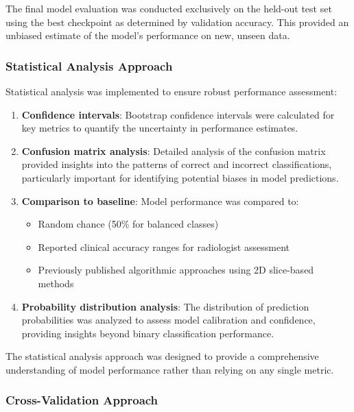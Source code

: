 \documentclass[12pt, a4paper]{article}
\begin{document}
The final model evaluation was conducted exclusively on the held-out test set using the best checkpoint as determined by validation accuracy. This provided an unbiased estimate of the model's performance on new, unseen data.

\subsubsection{Statistical Analysis Approach}

Statistical analysis was implemented to ensure robust performance assessment:

\begin{enumerate}
    \item \textbf{Confidence intervals}: Bootstrap confidence intervals were calculated for key metrics to quantify the uncertainty in performance estimates.
    
    \item \textbf{Confusion matrix analysis}: Detailed analysis of the confusion matrix provided insights into the patterns of correct and incorrect classifications, particularly important for identifying potential biases in model predictions.
    
    \item \textbf{Comparison to baseline}: Model performance was compared to:
    \begin{itemize}
        \item Random chance (50\% for balanced classes)
        \item Reported clinical accuracy ranges for radiologist assessment
        \item Previously published algorithmic approaches using 2D slice-based methods
    \end{itemize}
    
    \item \textbf{Probability distribution analysis}: The distribution of prediction probabilities was analyzed to assess model calibration and confidence, providing insights beyond binary classification performance.
\end{enumerate}

The statistical analysis approach was designed to provide a comprehensive understanding of model performance rather than relying on any single metric.

\subsubsection{Cross-Validation Approach}
\end{document}

